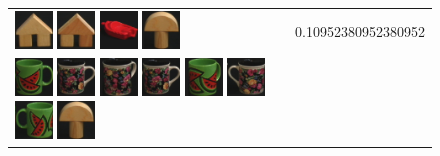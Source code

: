 \begin{figure}[tbp]
\begin{center}
\begin{tabular}{m{11cm} | m{3cm} |}
\includegraphics[width=1cm]{coil/beeld-42.eps}
\includegraphics[width=1cm]{coil/beeld-43.eps}
\includegraphics[width=1cm]{coil/beeld-22.eps}
\includegraphics[width=1cm]{coil/beeld-1.eps}
& {\scriptsize 0.10952380952380952}
\\
\includegraphics[width=1cm]{coil/beeld-30.eps}
\includegraphics[width=1cm]{coil/beeld-60.eps}
\includegraphics[width=1cm]{coil/beeld-63.eps}
\includegraphics[width=1cm]{coil/beeld-60.eps}
\includegraphics[width=1cm]{coil/beeld-33.eps}
\includegraphics[width=1cm]{coil/beeld-61.eps}
\includegraphics[width=1cm]{coil/beeld-31.eps}
\includegraphics[width=1cm]{coil/beeld-1.eps}

\end{tabular}
\end{center}
\end{figure}
